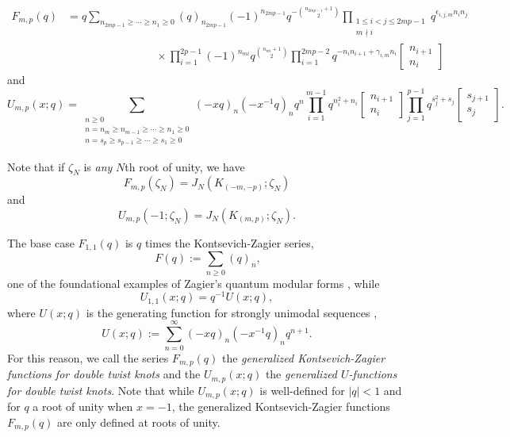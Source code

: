 \documentclass[11pt,reqno]{amsart}
\theoremstyle{definition}
\numberwithin{equation}{section}
\begin{document}
\begin{equation} \label{Fmp}
\begin{aligned}
F_{m,p}(q) &= q\sum_{n_{2mp-1} \geq \cdots \geq n_1 \geq 0} (q)_{n_{2mp-1}} (-1)^{n_{2mp-1}} q^{-\binom{n_{2mp-1} + 1}{2}} \prod_{\substack{1 \leq i < j \leq 2mp-1 \\ m \nmid i}} q^{\epsilon_{i,j,m}n_in_j} \\
&  \qquad \qquad \qquad \qquad \times \prod_{i=1}^{2p-1} (-1)^{n_{mi}} q^{\binom{n_{mi} + 1}{2}} \prod_{i=1}^{2mp - 2} q^{-n_i n_{i+1} + \gamma_{i, m} n_i}\begin{bmatrix} n_{i+1} \\ n_{i} \end{bmatrix}
\end{aligned}
\end{equation}
and
\begin{equation} \label{Ump}
U_{m,p}(x; q) = \sum_{\substack{n \geq 0 \\ n =n_m \geq n_{m-1} \geq \cdots \geq n_1 \geq 0 \\ n =s_p \geq s_{p-1} \geq \cdots \geq s_1 \geq 0}}
(-xq)_{n} (-x^{-1}q)_n q^n \prod_{i=1}^{m-1} q^{n_i^2+n_i} \begin{bmatrix} n_{i+1} \\ n_i \end{bmatrix} \prod_{j=1}^{p-1} q^{s_j^2+s_j} \begin{bmatrix} s_{j+1} \\ s_j \end{bmatrix}.
\end{equation}

\noindent  Note that if $\zeta_N$ is \emph{any} $N$th root of unity, we have 
\begin{equation} \label{Fatroot}
F_{m,p}(\zeta_N)  = J_N(K_{(-m,-p)};\zeta_N)
\end{equation}
and
\begin{equation} \label{Uatroot}
U_{m,p}(-1; \zeta_N) = J_N(K_{(m,p)};\zeta_N).
\end{equation}

The base case $F_{1,1}(q)$ is $q$ times the Kontsevich-Zagier series, 
\begin{equation} \
F(q) := \sum_{n \geq 0} (q)_n,
\end{equation}
one of the foundational examples of Zagier's quantum modular forms \cite{z-1,zagier}, while
\begin{equation}
U_{1,1}(x;q) = q^{-1}U(x;q),
\end{equation}
where  $U(x;q)$ is the generating function for strongly unimodal sequences \cite{bopr},
\begin{equation} \label{u}
U(x;q) :=\sum_{n=0}^{\infty} (-xq)_n (-x^{-1}q)_n q^{n+1}.
\end{equation}
For this reason, we call the series $F_{m,p}(q)$ the \emph{generalized Kontsevich-Zagier functions for double twist knots} and the $U_{m,p}(x;q)$ the \emph{generalized $U$-functions for double twist knots}. Note that while $U_{m,p}(x;q)$ is well-defined  for $|q| <1$ and for $q$ a root of unity when $x=-1$, the generalized Kontsevich-Zagier functions $F_{m,p}(q)$ are only defined at roots of unity. 
\end{document}
